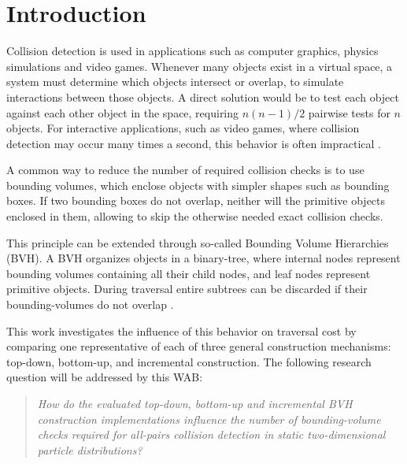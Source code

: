 \chapter{Introduction}

Collision detection is used in applications such as computer graphics, physics simulations and video games.
Whenever many objects exist in a virtual space, a system must determine which objects intersect or overlap, to simulate interactions between those objects.
A direct solution would be to test each object against each other object in the space, requiring $n(n-1)/2$ pairwise tests for $n$ objects.
For interactive applications, such as video games, where collision detection may occur many times a second, this behavior is often impractical \cite[p.~14]{ericson2004real}.

A common way to reduce the number of required collision checks is to use bounding volumes, which enclose objects with simpler shapes such as bounding boxes. 
If two bounding boxes do not overlap, neither will the primitive objects enclosed in them, allowing to skip the otherwise needed exact collision checks. \cite[pp.~75--81]{ericson2004real}

This principle can be extended through so-called Bounding Volume Hierarchies (BVH). 
A BVH organizes objects in a binary-tree, where internal nodes represent bounding volumes containing all their child nodes, and leaf nodes represent primitive objects. 
During traversal entire subtrees can be discarded if their bounding-volumes do not overlap \cite[pp.~235--260]{ericson2004real}.

This work investigates the influence of this behavior on traversal cost by comparing one representative of each of three general construction mechanisms: top-down, bottom-up, and incremental construction.
The following research question will be addressed by this WAB:

\begin{quote}
\textit{How do the evaluated top-down, bottom-up and incremental BVH construction implementations influence the number of bounding-volume checks required for all-pairs collision detection in static two-dimensional particle distributions?}
\end{quote}




\newpage